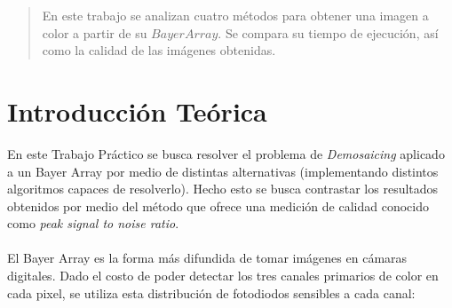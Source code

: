 \documentclass[a4paper]{article}
\begin{document}
\thispagestyle{empty}

\maketitle
\newpage

\thispagestyle{empty}
\vfill
\begin{abstract}
En este trabajo se analizan cuatro métodos para obtener una imagen a color a partir de su $Bayer Array$. Se compara su tiempo de ejecución, así como la calidad de las imágenes obtenidas.
\end{abstract}

\thispagestyle{empty}
\vspace{3cm}
\tableofcontents
\newpage



\section{Introducci\'{o}n Te\'{o}rica}
\label{sec:intro}



En este Trabajo Práctico se busca resolver el problema de \textit{Demosaicing} aplicado a un Bayer Array por medio de distintas alternativas (implementando distintos algoritmos capaces de resolverlo). Hecho esto se busca contrastar los resultados obtenidos por medio del método que ofrece una medición de calidad conocido como \textit{peak signal to noise ratio}. \\ \\

El Bayer Array es la forma más difundida de tomar imágenes en cámaras digitales. Dado el costo de poder detectar los tres canales primarios de color en cada pixel, se utiliza esta distribución de fotodiodos sensibles a cada canal:
\end{document}
